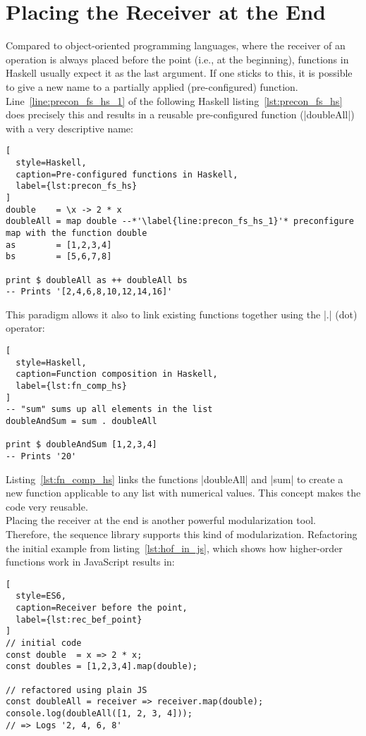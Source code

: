 \section{Placing the Receiver at the End} %
\label{sec:Placing the Receiver at the End}
Compared to object-oriented programming languages, where the receiver of an
operation is always placed before the point (i.e., at the beginning), functions
in Haskell usually expect it as the last argument. If one sticks to this, it is
possible to give a new name to a partially applied (pre-configured)
function. Line~\ref{line:precon_fs_hs_1} of the following Haskell
listing~\ref{lst:precon_fs_hs} does precisely this and results in a reusable
pre-configured function (|doubleAll|) with a very descriptive name:
\begin{lstlisting}[
  style=Haskell,
  caption=Pre-configured functions in Haskell,
  label={lst:precon_fs_hs}
]
double    = \x -> 2 * x
doubleAll = map double --*'\label{line:precon_fs_hs_1}'* preconfigure map with the function double
as        = [1,2,3,4]
bs        = [5,6,7,8]

print $ doubleAll as ++ doubleAll bs
-- Prints '[2,4,6,8,10,12,14,16]'
\end{lstlisting}

This paradigm allows it also to link existing functions together using the |.|
(dot) operator:

\begin{lstlisting}[
  style=Haskell,
  caption=Function composition in Haskell,
  label={lst:fn_comp_hs}
]
-- "sum" sums up all elements in the list
doubleAndSum = sum . doubleAll

print $ doubleAndSum [1,2,3,4]
-- Prints '20'
\end{lstlisting}

Listing~\ref{lst:fn_comp_hs} links the functions |doubleAll| and |sum| to
create a new function applicable to any list with numerical values. This
concept makes the code very reusable.\\
Placing the receiver at the end is another powerful modularization
tool. Therefore, the sequence library supports this kind of modularization.
Refactoring the initial example from listing~\ref{lst:hof_in_js}, which 
shows how higher-order functions work in JavaScript results in:

\begin{lstlisting}[
  style=ES6,
  caption=Receiver before the point,
  label={lst:rec_bef_point}
]
// initial code
const double  = x => 2 * x;
const doubles = [1,2,3,4].map(double);

// refactored using plain JS
const doubleAll = receiver => receiver.map(double);
console.log(doubleAll([1, 2, 3, 4]));
// => Logs '2, 4, 6, 8'
\end{lstlisting}

